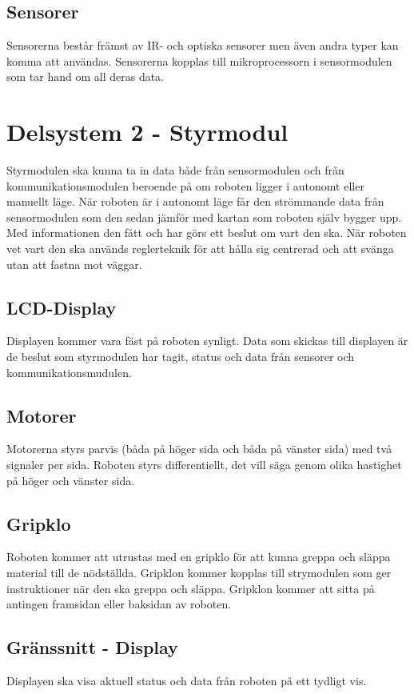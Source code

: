 \documentclass[11pt]{article}
\begin{document}
\begin{flushleft}
\subsection{Sensorer}
Sensorerna består främst av IR- och optiska sensorer men även andra typer kan komma att användas. Sensorerna kopplas till mikroprocessorn i sensormodulen som tar hand om all deras data.

\section{Delsystem 2 - Styrmodul}
Styrmodulen ska kunna ta in data både från sensormodulen och från kommunikationsmodulen beroende på om roboten ligger i autonomt eller manuellt läge. När roboten är i autonomt läge får den strömmande data från sensormodulen som den sedan jämför med kartan som roboten själv bygger upp. Med informationen den fått och har görs ett beslut om vart den ska. När roboten vet vart den ska används reglerteknik för att hålla sig centrerad och att svänga utan att fastna mot väggar.    


\subsection{LCD-Display}
Displayen kommer vara fäst på roboten synligt. Data som skickas till displayen är de beslut som styrmodulen har tagit, status och data från sensorer och kommunikationsmudulen.

\subsection{Motorer}
Motorerna styrs parvis (båda på höger sida och båda på vänster sida) med två signaler per sida. Roboten styrs differentiellt, det vill säga genom olika hastighet på höger och vänster sida. 

\subsection{Gripklo}
Roboten kommer att utrustas med en gripklo för att kunna greppa och släppa material till de nödställda. Gripklon kommer kopplas till strymodulen som ger instruktioner när den ska greppa och släppa. Gripklon kommer att sitta på antingen framsidan eller baksidan av roboten. 

\subsection{Gränssnitt - Display}
Displayen ska visa aktuell status och data från roboten på ett tydligt vis.


\end{flushleft}
\end{document}
